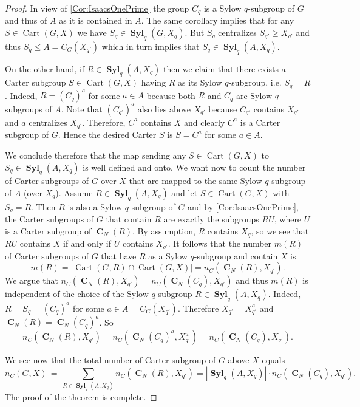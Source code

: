 \documentclass[a4paper,12pt,reqno]{amsart}
\numberwithin{equation}{section}
\DeclareMathOperator{\cart}{Cart}
\DeclareMathOperator{\cent}{\mathbf{C}}
\DeclareMathOperator{\syl}{\mathbf{Syl}}
\newcommand{\card}[1]{\left\lvert{#1}\right\rvert}
\renewcommand{\leq}{\leqslant}
\renewcommand{\geq}{\geqslant}
\begin{document}
\begin{proof}
In view of \autoref{Cor:IsaacsOnePrime} the group  $C_q$ is a Sylow $q$-subgroup of $G$ and thus of $A$ as it is contained in $A$. The same corollary implies that  for any  $S \in \cart(G, X)$ we have $S_q \in \syl_q(G, X_q)$. But $S_q$ centralizes $S_{q'} \geq X_{q'}$ and thus $S_q \leq A= C_G(X_{q'})$ which in turn implies that $S_q  \in  \syl_q(A, X_q)$. 

 On the other hand, if $R \in \syl_q(A, X_q)$ then we claim that there exists a Carter subgroup $S \in \cart(G,X)$ having $R$ as its Sylow $q$-subgroup, i.e. $S_q=R$. Indeed, $R = (C_q)^a$ for some $a \in A$ because both $R$ and $C_q$ are Sylow $q$-subgroups of $A$. Note that $(C_{q'})^a$ also lies above $X_{q'}$ because $C_{q'}$ contains $X_{q'}$ and $a$ centralizes $X_{q'}$. Therefore, $C^a$ contains $X$ and clearly $C^a$ is a Carter subgroup of $G$. 
 Hence the desired Carter $S$ is $S= C^a$ for some $a \in A$.

We conclude therefore that the map sending any $S \in \cart(G, X)$ to  $S_q \in \syl_q(A, X_q)$ is well defined and  onto. We want now to count the number of  Carter subgroups of $G$ over $X$ that are  mapped to the same Sylow $q$-subgroup  of $A$ (over $X_q$). Assume $R \in \syl_q(A, X_q)$ and let $S \in \cart(G, X)$ with $S_q=R$. 
Then $R $ is also a Sylow $q$-subgroup of $G$ and 
by  \autoref{Cor:IsaacsOnePrime}, the Carter subgroups of $G$ that contain  $R$  are exactly
the subgroups $R U$, where $U$ is a Carter subgroup of $\cent_N(R)$. By
	assumption, $R$ contains $X_{q}$, so we see that $RU$ contains $X$ if
	and only if $U$ contains $X_{q'}$. It follows that the number $m(R)$ of Carter subgroups of $G$ that have  $R$ as a Sylow $q$-subgroup and  contain $X$ is
	\[
	m(R) = \card{\cart(G, R) \cap \cart(G, X)} =  n_C(\cent_N(R), X_{q'}).
	\]
	We argue that $n_C(\cent_N(R), X_{q'})=n_C(\cent_N(C_{q}), X_{q'})$ 
	and thus $m(R)$  is independent of the choice of the Sylow $q$-subgroup  $R \in  \syl_q(A, X_{q})$. 
	  Indeed, $R= S_q= (C_q)^a$  for some $a \in A= C_G(X_{q'})$. Therefore $X_{q'} = X_{q'}^a$ and $\cent_N(R)= \cent_N(C_q)^a$. So  
	\[
	n_C(\cent_N(R), X_{q'}) = n_C(\cent_N(C_{q})^a, X_{q'}^a)= 
	n_C(\cent_N(C_{q}), X_{q'}).
	\]

We see now that the total number of Carter subgroup of $G$ above $X$ equals 
\[
n_C(G,X) \, = \, \sum_{R \in \syl_{q}(A, X_{q})} n_C(\cent_N(R), X_{q'})= 
|\syl_q(A, X_q) | \cdot n_C(\cent_N(C_{q}), X_{q'}).
\]
The proof of the theorem is complete.
\end{proof}
\end{document}
